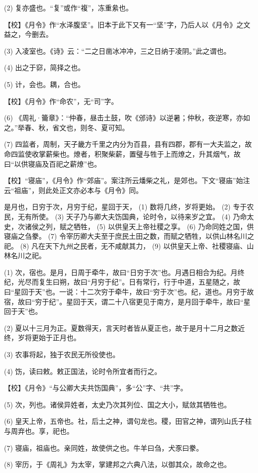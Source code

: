 \documentclass[12pt,UTF8]{ctexbook}
\begin{document}
(2) 复亦盛也。“复”或作“複”，冻重絫也。

【校】《月令》作“水泽腹坚”。旧本于此下又有一“坚”字，乃后人以《月令》之文益之，今删去。

(3) 入凌室也。《诗》云：“二之日凿冰冲冲，三之日纳于凌阴。”此之谓也。

(4) 出之于窌，简择之也。

(5) 计，会也。耦，合也。

【校】《月令》作“命农”，无“司”字。

(6) 《周礼·籥章》：“仲春，昼击土鼓，吹《邠诗》以逆暑；仲秋，夜逆寒，亦如之。”举春、秋，省文也，则冬、夏可知。

(7) 四监者，周制，天子畿方千里之内分为百县，县有四郡，郡有一大夫监之，故命四监使收掌薪柴也。燎者，积聚柴薪，置璧与牲于上而燎之，升其烟气，故曰“以供寝庙及百祀之薪燎”也。

【校】“寝庙”，《月令》作“郊庙”。案注所云燔柴之礼，是郊也。下文“寝庙”始注云“祖庙”，则此处正文亦必本与《月令》同。

是月也，日穷于次，月穷于纪，星回于天， (1) 数将几终，岁将更始。 (2) 专于农民，无有所使。 (3) 天子乃与卿大夫饬国典，论时令，以待来岁之宜。 (4) 乃命太史，次诸侯之列，赋之牺牲， (5) 以供皇天上帝社稷之享。 (6) 乃命同姓之国，供寝庙之刍豢。 (7) 令宰历卿大夫至于庶民土田之数，而赋之牺牲，以供山林名川之祀。 (8) 凡在天下九州之民者，无不咸献其力， (9) 以供皇天上帝、社稷寝庙、山林名川之祀。

(1) 次，宿也。是月，日周于牵牛，故曰“日穷于次”也。月遇日相合为纪。月终纪，光尽而复生曰朔，故曰“月穷于纪”。日有常行，行于中道，五星随之，故曰“星回于天”也。一说：十二次穷于牵牛，故曰“穷于次”也。纪，道也。月穷于故宿，故曰“穷于纪”。星回于天，谓二十八宿更见于南方，是月回于牵牛，故曰“星回于天”也。

(2) 夏以十三月为正。夏数得天，言天时者皆从夏正也，故于是月十二月之数近终，岁将更始于正月也。

(3) 农事将起，独于农民无所役使也。

(4) 饬，读曰敕。敕正国法，论时令所宜者而行之。

【校】《月令》“与公卿大夫共饬国典”，多“公”字、“共”字。

(5) 次，列也。诸侯异姓者，太史乃次其列位、国之大小，赋敛其牺牲也。

(6) 皇天上帝，五帝也。社，后土之神，谓句龙也。稷，田官之神，谓列山氏子柱与周弃也。享，祀也。

(7) 寝庙，祖庙也。亲同姓，故使供之也。牛羊曰刍，犬豕曰豢。

(8) 宰历，于《周礼》为太宰，掌建邦之六典八法，以御其众，故命之也。
\end{document}
